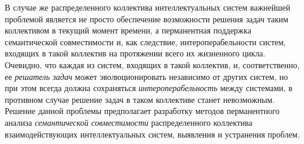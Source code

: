 В случае же распределенного коллектива интеллектуальных систем важнейшей проблемой является не просто обеспечение возможности решения задач таким коллективом в текущий момент времени, а перманентная поддержка семантической совместимости и, как следствие, интероперабельности систем, входящих в такой коллектив на протяжении всего их жизненного цикла. Очевидно, что каждая из систем, входящих в такой коллектив, и, соответственно, ее \textit{решатель задач} может эволюционировать независимо от других систем, но при этом всегда должна сохраняться \textit{интероперабельность} между системами, в противном случае решение задач в таком коллективе станет невозможным. Решение данной проблемы предполагает разработку методов перманентного анализа \textit{семантической совместимости} распределенного коллектива взаимодействующих интеллектуальных систем, выявления и устранения проблем.

